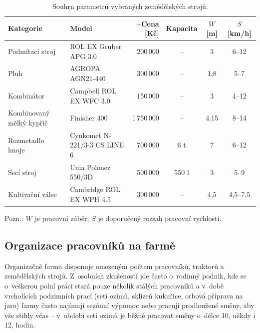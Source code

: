 \documentclass[11pt,a4paper]{article}
\begin{document}
\begin{table}[H]
    \centering
    \begin{threeparttable}
        \setlength{\tabcolsep}{4pt}
        \renewcommand{\arraystretch}{1.12}
        \small
        \begin{tabularx}{\linewidth}{@{}lXrccc@{}}
            \toprule
            Kategorie & Model & \textasciitilde{Cena} [Kč] & Kapacita & $W$ [m] & $S$ [km/h] \\ \midrule
            Podmítací stroj & ROL EX Gruber APG 3.0\cite{eshop-zp-podmítač}
              & 200\,000 & -- & 3 & 6--12 \\
            Pluh & AGROPA AGN21-440\cite{eshop-zp-pluh}
              & 300\,000 & -- & 1,8 & 5--7 \\
            Kombinátor & Campbell ROL EX WFC 3.0\cite{eshop-zp-kombinátor}
              & 150\,000 & -- & 3 & 4--12 \\
            Kombinovaný mělký kypřič & Finisher 400\cite{eshop-fomex-kombinovaný-kypřič}
              & 1\,750\,000 & -- & 4.15 & 8--14 \\
            Rozmetadlo hnoje & Cynkomet N-221/3-3 CS LINE 6\cite{eshop-zp-rozmetadlo-hnoje}
              & 700\,000 & 6 t & 7 & 6--12 \\
            Secí stroj & Unia Polonez 550/3D\cite{eshop-zp-secí-stroj}
              & 500\,000 & 550 l & 3 & 5--9 \\
            Kultivační válec & Cambridge ROL EX WPH 4.5\cite{eshop-zp-kultivační-válec}
              & 300\,000 & -- & 4,5 & 4,5--7,5 \\
            \bottomrule
        \end{tabularx}
        \begin{tablenotes}[flushleft]
            \footnotesize
            \item Pozn.: $W$ je pracovní záběr, $S$ je doporučený rozsah pracovní rychlosti.
        \end{tablenotes}
    \end{threeparttable}
    \caption{Souhrn parametrů vybraných zemědělských strojů.}
    \label{tab:shrnuti-stroju}
\end{table}

\subsection{Organizace pracovníků na farmě}

Organizačně farma disponuje omezeným počtem pracovníků, traktorů a zemědělských strojů. Z~osobních zkušeností jde často o~rodinný podnik, kde se o~veškerou polní práci stará pouze několik stálých pracovníků a v~době vrcholících podzimních prací (setí ozimů, sklizeň kukuřice, orbová příprava na jaro) farmy často najímají sezónní výpomoc nebo pracují prodloužené směny, aby vše stihly včas -- v~období setí ozimů je běžné pracovat směny o~délce 10, někdy i 12, hodin.
\end{document}
